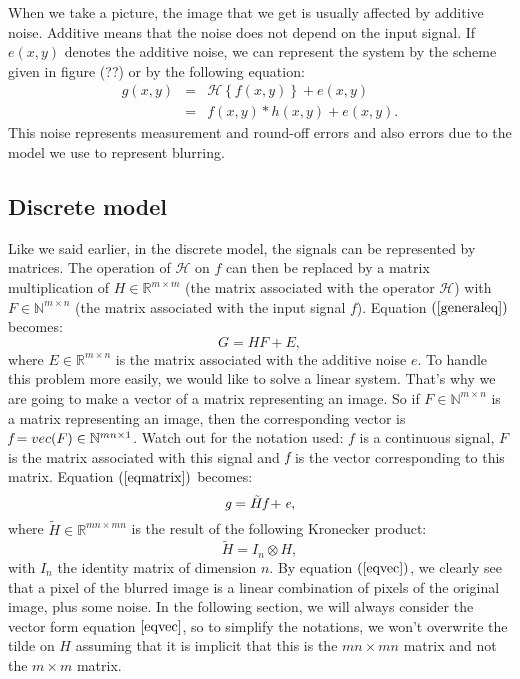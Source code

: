 When we take a picture, the image that we get is usually affected by additive noise. Additive means that the noise does not depend on the input signal. If $e(x,y)$ denotes the additive noise, we can represent the system by the scheme  given in figure (??) or by the following equation:
\begin{eqnarray}
g(x,y) &=& \mathcal{H}\left\lbrace f(x,y) \right\rbrace + e(x,y) \\
 &=& f(x,y) \ast h(x,y) + e(x,y).
\label{generaleq}
\end{eqnarray}
This noise represents measurement and round-off errors and also errors due to the model we use to represent blurring. 


\subsection{Discrete model}

Like we said earlier, in the discrete model, the signals can be represented by matrices. The operation of $\mathcal{H}$ on $f$ can then be replaced by a matrix multiplication of $H \in \mathbb{R}^{m \times m}$ (the matrix associated with the operator $\mathcal{H}$) with $F \in \mathbb{N}^{m \times n}$ (the matrix associated with the input signal $f$). Equation $(\ref{generaleq})$ becomes:
\begin{equation}
G = HF + E,
\label{eqmatrix}
\end{equation}
where $E \in \mathbb{R}^{m \times n}$ is the matrix associated with the additive noise $e$. To handle this problem more easily, we would like to solve a linear system. That's why we are going to make a vector of a matrix representing an image. So if $F \in \mathbb{N}^{m \times n}$ is a matrix representing an image, then the corresponding vector is $\emph{f} = vec(F) \in \mathbb{N}^{mn \times 1}$. Watch out for the notation used: $f$ is a continuous signal, $F$ is the matrix associated with this signal and $\emph{f}$  is the vector corresponding to this matrix. Equation $(\ref{eqmatrix})$ becomes:
\begin{equation}
\emph{g} = \tilde{H}\emph{f} + \emph{e},
\label{eqvec}
\end{equation}
where $\tilde{H} \in \mathbb{R}^{mn \times mn}$ is the result of the following Kronecker product:
\begin{equation}
\tilde{H} = I_n \otimes H,
\end{equation}
with $I_n$ the identity matrix of dimension $n$. By equation $(\ref{eqvec})$, we clearly see that a pixel of the blurred image is a linear combination of pixels of the original image, plus some noise. In the following section, we will always consider the vector form equation $\ref{eqvec}$, so to simplify the notations, we won't overwrite the tilde on $H$ assuming that it is implicit that this is the $mn \times mn$ matrix and not the $m \times m$ matrix.

